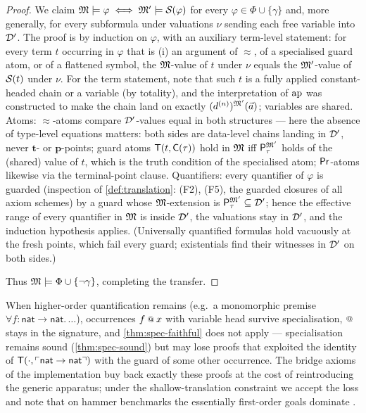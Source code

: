\begin{proof}
We claim $\mathfrak{M} \models \varphi \iff \mathfrak{M}' \models
\mathcal{S}_{}(\varphi)$ for every $\varphi \in \Phi \cup \{\gamma\}$ and,
more generally, for every subformula under valuations $\nu$ sending
each free variable into $\mathcal{D}'$.  The proof is by induction on
$\varphi$, with an auxiliary term-level statement: for every term
$t$ occurring in $\varphi$ that is (i) an argument of $\approx$, of
a specialised guard atom, or of a flattened symbol, the
$\mathfrak{M}$-value of $t$ under $\nu$ equals the $\mathfrak{M}'$-value of
$\mathcal{S}_{}(t)$ under $\nu$.  For the term statement, note that such
$t$ is a fully applied constant-headed chain or a variable (by
totality), and the interpretation of $\mathrm{ap}$ was constructed to make
the chain land on exactly $(d^{(n)})^{\mathfrak{M}'}(\vec{a})$; variables are
shared.  Atoms: $\approx$-atoms compare $\mathcal{D}'$-values equal in both
structures --- here the absence of type-level equations matters:
both sides are data-level chains landing in $\mathcal{D}'$, never
$\mathbf{t}$- or $\mathbf{p}$-points; guard atoms $\mathsf{T}(t,
\mathsf{C}(\tau))$ hold in $\mathfrak{M}$ iff $\mathsf{P}_{\tau}^{\mathfrak{M}'}$ holds of the
(shared) value of $t$, which is the truth condition of the
specialised atom; $\mathsf{Pr}$-atoms likewise via the terminal-point
clause.  Quantifiers: every quantifier of $\varphi$ is guarded
(inspection of \cref{def:translation}: (F2), (F5), the guarded
closures of all axiom schemes) by a guard whose $\mathfrak{M}$-extension is
$\mathsf{P}_{\tau}^{\mathfrak{M}'} \subseteq \mathcal{D}'$; hence the effective range of
every quantifier in $\mathfrak{M}$ is inside $\mathcal{D}'$, the valuations stay in
$\mathcal{D}'$, and the induction hypothesis applies.  (Universally
quantified formulas hold vacuously at the fresh points, which fail
every guard; existentials find their witnesses in $\mathcal{D}'$ on both
sides.)

Thus $\mathfrak{M} \models \Phi \cup \{\neg\gamma\}$, completing the
transfer.
\end{proof}

\begin{remark}
\label{rem:spec-partial}
When higher-order quantification remains (e.g.\ a monomorphic
premise $\forall f{:}\mathsf{nat} \to \mathsf{nat}.\,\ldots$),
occurrences $f \app x$ with variable head survive specialisation,
$\app$ stays in the signature, and \cref{thm:spec-faithful} does
not apply --- specialisation remains sound
(\cref{thm:spec-sound}) but may lose proofs that exploited the
identity of $\mathsf{T}(\cdot, \ulcorner \mathsf{nat} \to \mathsf{nat} \urcorner)$
with the guard of some other occurrence.  The bridge axioms of the
implementation buy back exactly these proofs at the cost of
reintroducing the generic apparatus; under the shallow-translation
constraint we accept the loss and note that on hammer benchmarks
the essentially first-order goals dominate
\cite{CzajkaKaliszyk2018}.
\end{remark}

